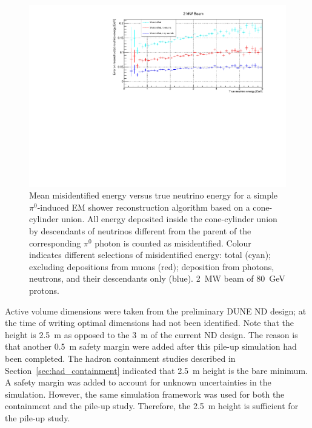 \documentclass[a4paper]{article}
\begin{document}
\begin{figure}[tbp]
	\centering
	\includegraphics[width=\textwidth]{Figures/2MW/misid_abs_x}
	\caption[Pile-up study mean misidentified vs.\ true neutrino energy, \SI{2}{\mega\watt} beam]{%
		Mean misidentified energy versus true neutrino energy for a simple $\pi^0$-induced EM shower reconstruction algorithm based on a cone-cylinder union.
		All energy deposited inside the cone-cylinder union by descendants of neutrinos different from the parent of the corresponding $\pi^0$ photon is counted as misidentified.
		Colour indicates different selections of misidentified energy: total (cyan); excluding depositions from muons (red); deposition from photons, neutrons, and their descendants only (blue).
		\SI{2}{\mega\watt} beam of \SI{80}{\giga\electronvolt} protons.
	}
	\label{fig:dune-nd_2MW_misid-abs-x}
\end{figure}

Active volume dimensions were taken from the preliminary DUNE ND design; at the time of writing optimal dimensions had not been identified.
Note that the height is \SI{2.5}{\metre} as opposed to the \SI{3}{\metre} of the current ND design.
The reason is that another \SI{0.5}{\metre} safety margin were added after this pile-up simulation had been completed.
The hadron containment studies described in Section~\ref{sec:had_containment} indicated that \SI{2.5}{\metre} height is the bare minimum.
A safety margin was added to account for unknown uncertainties in the simulation.
However, the same simulation framework was used for both the containment and the pile-up study.
Therefore, the \SI{2.5}{\metre} height is sufficient for the pile-up study.
\end{document}
